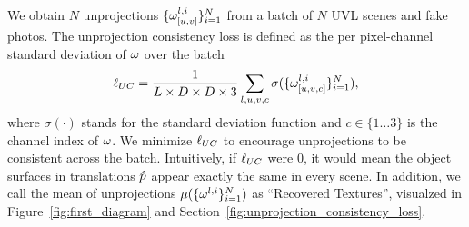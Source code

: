 \documentclass{article}
\begin{document}
        We obtain $N$ unprojections $\{\omega_{[u,v]}^{l,i}\}_{i=1}^{N}$ from a batch of $N$ UVL scenes and fake photos. The unprojection consistency loss is defined as the per pixel-channel standard deviation of $\omega$ over the batch
        \begin{equation}
            \ell_{UC} = \frac{1}{L\times D\times D\times 3}\sum_{l,u,v,c}\sigma(\{\omega^{l,i}_{[u,v,c]}\}_{i=1}^{N}),
        \end{equation}
        where $\sigma(\cdot)$ stands for the standard deviation function and $c \in \{1\dots 3\}$ is the channel index of $\omega$.
		We minimize $\ell_{UC}$ to encourage unprojections to be consistent across the batch. Intuitively, if $\ell_{UC}$ were $0$, it would mean the object surfaces in translations $\hat{p}$ appear exactly the same in every scene. In addition, we call the mean of unprojections $\mu(\{\omega^{l,i}\}_{i=1}^N)$ as ``Recovered Textures'', visualzed in Figure~\ref{fig:first_diagram} and Section~\ref{fig:unprojection_consistency_loss}.


		
\end{document}
